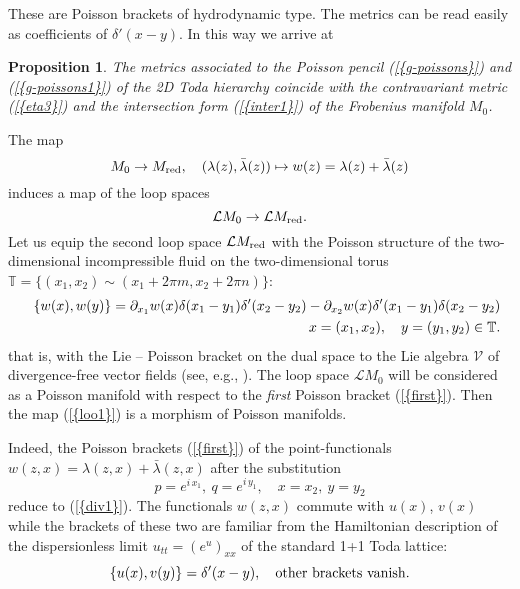 \documentclass[numbook, envcountsame, envcountreset]{svjour3}
\newtheorem{prop}[theorem]{Proposition}
\begin{document}
These are Poisson brackets of hydrodynamic type. The metrics can be read easily as coefficients of ${\delta}'(x-y)$. In this way we arrive at

\begin{prop}
The metrics associated to the Poisson pencil {(\ref{{g-poissons}})} and {(\ref{{g-poissons1}})} of the 2D Toda hierarchy coincide with the contravariant metric {(\ref{{eta3}})} and the intersection form {(\ref{{inter1}})} of the Frobenius manifold $M_0$.
\end{prop}

\begin{remark} The map
$$
M_0 \to M_{\rm red}, \quad (\lambda(z), \bar \lambda(z))\mapsto w(z)=\lambda(z)+\bar\lambda(z)
$$
induces a map of the loop spaces
\begin{equation}\label{loo1}
{{\mathcal L}} M_0 \to {{\mathcal L}} M_{\rm red}.
\end{equation}
Let us equip the second loop space ${{\mathcal L}} M_{\rm red}$ with the Poisson structure of the two-dimensional incompressible fluid on the two-dimensional torus $\mathbb T = \{ (x_1, x_2)\sim (x_1+2\pi m, x_2+2\pi n)\}$: 
\begin{eqnarray}\label{div1}
&&
\{ w(x), w(y)\} = {\partial}_{x_1}w(x) \delta(x_1-y_1)\delta'(x_2-y_2) -{\partial}_{x_2}w(x) \delta'(x_1-y_1) \delta(x_2-y_2)
\\
&&
x=(x_1, x_2), \quad y=(y_1,y_2)\in \mathbb{T}. 
{\nonumber}
\end{eqnarray} 
that is, with the Lie -- Poisson bracket on the dual space to the Lie algebra $\mathcal{V}$ of divergence-free vector fields (see, e.g., \cite{aa,nov}). The loop space ${{\mathcal L}} M_0$ will be considered as a Poisson manifold with respect to the {\em first} Poisson bracket {(\ref{{first}})}. Then the map {(\ref{{loo1}})} is a morphism of Poisson manifolds.
\end{remark}

Indeed, the Poisson brackets {(\ref{{first}})} of the point-functionals $w(z, x)=\lambda(z,x) +\bar\lambda(z,x)$ after the substitution
$$
p=e^{i\, x_1},~ q=e^{i\, y_1}, \quad x=x_2, ~ y=y_2
$$
reduce to {(\ref{{div1}})}. The functionals $w(z,x)$ commute with $u(x)$, $v(x)$ while the brackets of these two are familiar from the Hamiltonian description of the dispersionless limit $u_{tt}=\left( e^u\right)_{xx}$ of the standard 1+1 Toda lattice:
$$
\{ u(x), v(y)\} =\delta'(x-y), \quad {\rm other ~ brackets ~ vanish}.
$$

\medskip
\end{document}
